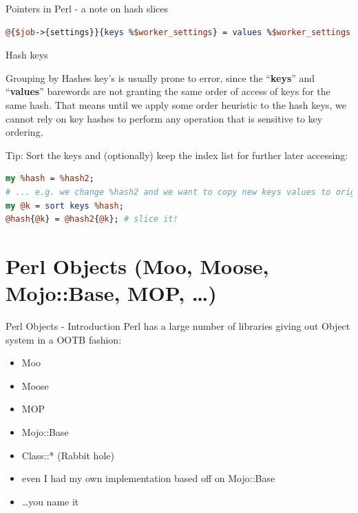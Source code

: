 \documentclass[10pt]{beamer}
\begin{document}
\begin{frame}[fragile]{Pointers in Perl - a note on hash slices}

\begin{lstlisting}[language=perl]
@{$job->{settings}}{keys %$worker_settings} = values %$worker_settings; # BAD!
\end{lstlisting}

\begin{alertblock}{Hash keys}

Grouping by Hashes key's is usually prone to error, since the ``\textbf{keys}'' and ``\textbf{values}'' barewords are not granting the same order of access of keys for the same hash.
That means until we apply some order heuristic to the hash keys, we cannot rely on key hashes to perform any operation that is sensitive to key ordering.

Tip: Sort the keys and (optionally) keep the index list for further later accessing:
\begin{lstlisting}[language=perl]
my %hash = %hash2;
# ... e.g. we change %hash2 and we want to copy new keys values to original hash
my @k = sort keys %hash;
@hash{@k} = @hash2{@k}; # slice it!
\end{lstlisting}

\end{alertblock}

\end{frame}


\section{Perl Objects (Moo, Moose, Mojo::Base, MOP, \ldots)}

\begin{frame}[fragile]{Perl Objects - Introduction}
Perl has a large number of libraries giving out Object system in a OOTB fashion:
\begin{itemize}
\item Moo
\item Moose
\item MOP
\item Mojo::Base
\item Class::* (Rabbit hole)
\item even I had my own implementation based off on Mojo::Base
\item \ldots you name it
\end{itemize}
\end{frame}
\end{document}
